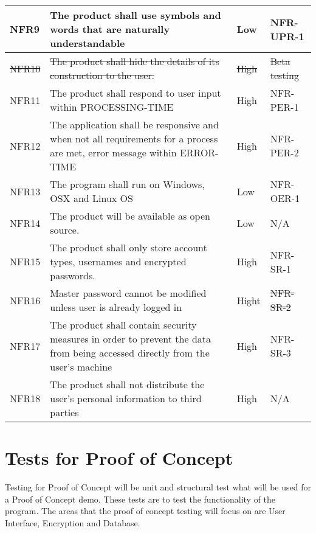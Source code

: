 \documentclass[12pt, titlepage]{article}
\begin{document}
\begin{table}[!htbp]
    \begin{tabularx}{\textwidth}{p{2cm}Xp{2cm}X}
        \midrule

        NFR9  & The product shall use symbols and words that are naturally understandable & Low & NFR-UPR-1\\\hline
        \sout{NFR10} & \sout{The product shall hide the details of its construction to the user.} & \sout{High} & \sout{Beta testing}\\\hline
        NFR11 & The product shall respond to user input within PROCESSING-TIME & High & NFR-PER-1\\\hline
        NFR12 & The application shall be responsive and when not all requirements for a process are met, error message within ERROR-TIME & High & NFR-PER-2\\\hline
        NFR13 & The program shall run on Windows, OSX and Linux OS & Low & NFR-OER-1\\\hline
        NFR14 & The product will be available as open source. & Low & N/A\\\hline
        NFR15 & The product shall only store account types, usernames and encrypted passwords. & High & NFR-SR-1\\\hline
        NFR16 & Master password cannot be modified unless user is already logged in & Hight & \sout{NFR-SR-2}\\\hline
        NFR17 & The product shall contain security measures in order to prevent the data from being accessed directly from the user’s machine & High & NFR-SR-3\\\hline
        NFR18 & The product shall not distribute the user’s personal information to third parties & High & N/A\\

        \bottomrule

    \end{tabularx}
\end{table}

\section{Tests for Proof of Concept}

Testing for Proof of Concept will be unit and structural test what will be used for a Proof of Concept demo. These tests are to test the functionality of the program. The areas that the proof of concept testing will focus on are User Interface, Encryption and Database.
\end{document}
